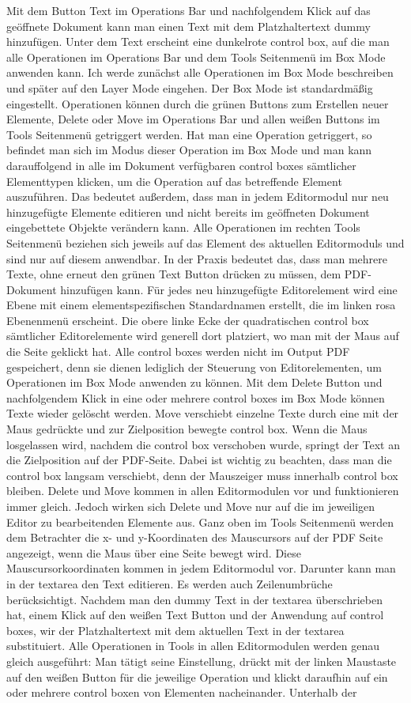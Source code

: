 Mit dem Button Text im Operations Bar und nachfolgendem Klick auf das geöffnete Dokument kann man einen Text mit dem Platzhaltertext dummy hinzufügen. Unter dem Text erscheint eine dunkelrote control box, auf die man alle Operationen im Operations Bar und dem Tools Seitenmenü im Box Mode anwenden kann. Ich werde zunächst alle Operationen im Box Mode beschreiben und später auf den Layer Mode eingehen. Der Box Mode ist standardmäßig eingestellt. Operationen können durch die grünen Buttons zum Erstellen neuer Elemente, Delete oder Move im Operations Bar und allen weißen Buttons im Tools Seitenmenü getriggert werden. Hat man eine Operation getriggert, so befindet man sich im Modus dieser Operation im Box Mode und man kann darauffolgend in alle im Dokument verfügbaren control boxes sämtlicher Elementtypen klicken, um die Operation auf das betreffende Element auszuführen. Das bedeutet außerdem, dass man in jedem Editormodul nur neu hinzugefügte Elemente editieren und nicht bereits im geöffneten Dokument eingebettete Objekte verändern kann. Alle Operationen im rechten Tools Seitenmenü beziehen sich jeweils auf das Element des aktuellen Editormoduls und sind nur auf diesem anwendbar. In der Praxis bedeutet das, dass man mehrere Texte, ohne erneut den grünen Text Button drücken zu müssen, dem PDF-Dokument hinzufügen kann. Für jedes neu hinzugefügte Editorelement wird eine Ebene mit einem elementspezifischen Standardnamen erstellt, die im linken rosa Ebenenmenü erscheint. Die obere linke Ecke der quadratischen control box sämtlicher Editorelemente wird generell dort platziert, wo man mit der Maus auf die Seite geklickt hat. Alle control boxes werden nicht im  Output PDF gespeichert, denn sie dienen lediglich der Steuerung von Editorelementen, um Operationen im Box Mode anwenden zu können. Mit dem Delete Button und nachfolgendem Klick in eine oder mehrere control boxes im Box Mode können Texte wieder gelöscht werden. Move verschiebt einzelne Texte durch eine mit der Maus gedrückte und zur Zielposition bewegte control box. Wenn die Maus losgelassen wird, nachdem die control box verschoben wurde, springt der Text an die Zielposition auf der PDF-Seite. Dabei ist wichtig zu beachten, dass man die control box langsam verschiebt, denn der Mauszeiger muss innerhalb control box bleiben. Delete und Move kommen in allen Editormodulen vor und funktionieren immer gleich. Jedoch wirken sich Delete und Move nur auf die im jeweiligen Editor zu bearbeitenden Elemente aus. Ganz oben im Tools Seitenmenü werden dem Betrachter die x- und y-Koordinaten des Mauscursors auf der PDF Seite angezeigt, wenn die Maus über eine Seite bewegt wird. Diese Mauscursorkoordinaten kommen in jedem Editormodul vor. Darunter kann man in der textarea den Text editieren. Es werden auch Zeilenumbrüche berücksichtigt. Nachdem man den dummy Text in der textarea überschrieben hat, einem Klick auf den weißen Text Button und der Anwendung auf control boxes, wir der Platzhaltertext mit dem aktuellen Text in der textarea substituiert. Alle Operationen in Tools in allen Editormodulen werden genau gleich ausgeführt: Man tätigt seine Einstellung, drückt mit der linken Maustaste auf den weißen Button für die jeweilige Operation und klickt daraufhin auf ein oder mehrere control boxen von Elementen nacheinander. Unterhalb der 